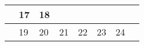 {\begin{tabularx}{\linewidth}{|l!{\vrule width \myLenLineThicknessThick}*{7}{@{}X@{}|}}
       & 
    
      
      
        \begin{minipage}[t]{6mm}\centering{}17\end{minipage}
      
       & 
    
      
      
        \begin{minipage}[t]{6mm}\centering{}18\end{minipage}
      
      
        \\  \hline 
      
    
  
  
  
  \hyperlink{week-2027-16}{} &
    
      
      
        \begin{minipage}[t]{6mm}\centering{}19\end{minipage}
      
       & 
    
      
      
        \begin{minipage}[t]{6mm}\centering{}20\end{minipage}
      
       & 
    
      
      
        \begin{minipage}[t]{6mm}\centering{}21\end{minipage}
      
       & 
    
      
      
        \begin{minipage}[t]{6mm}\centering{}22\end{minipage}
      
       & 
    
      
      
        \begin{minipage}[t]{6mm}\centering{}23\end{minipage}
      
       & 
    
      
      
        \begin{minipage}[t]{6mm}\centering{}24\end{minipage}
      

\end{tabularx}}
